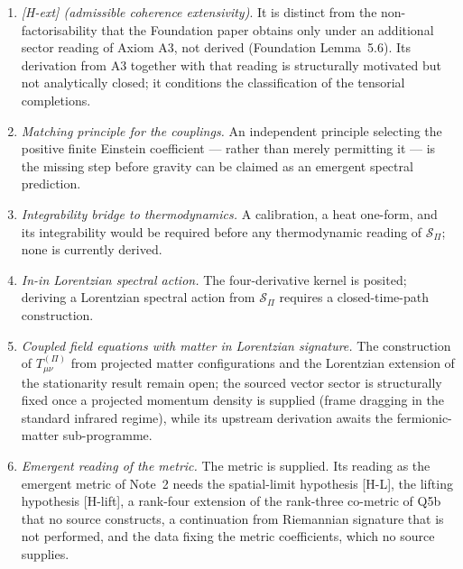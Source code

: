 \documentclass[11pt,a4paper]{article}
\theoremstyle{definition}
\newcommand{\SPI}{\mathcal{S}_\Pi}
\begin{document}
      \begin{enumerate}
        \item \textit{[H-ext] (admissible coherence extensivity)}.
        It is distinct from the non-factorisability that the Foundation paper obtains only under an
        additional sector reading of Axiom A3, not derived (Foundation Lemma~5.6).
        Its derivation from A3 together with that reading is structurally motivated but
        not analytically closed; it conditions the classification of the tensorial
        completions.

        \item \textit{Matching principle for the couplings.}
        An independent principle selecting the positive finite Einstein coefficient ---
        rather than merely permitting it --- is the missing step before gravity can be
        claimed as an emergent spectral prediction.

        \item \textit{Integrability bridge to thermodynamics.}
        A calibration, a heat one-form, and its integrability would be required before any
        thermodynamic reading of $\SPI$; none is currently derived.

        \item \textit{In-in Lorentzian spectral action.}
        The four-derivative kernel is posited; deriving a Lorentzian spectral action from
        $\SPI$ requires a closed-time-path construction.

        \item \textit{Coupled field equations with matter in Lorentzian signature.}
        The construction of $T_{\mu\nu}^{(\Pi)}$ from projected matter configurations and
        the Lorentzian extension of the stationarity result remain open; the sourced
        vector sector is structurally fixed once a projected momentum density is supplied
        (frame dragging in the standard infrared regime), while its upstream derivation
        awaits the fermionic-matter sub-programme.

        \item \textit{Emergent reading of the metric.}
        The metric is supplied.
        Its reading as the emergent metric of Note~2 needs the spatial-limit hypothesis [H-L], the lifting
        hypothesis [H-lift], a rank-four extension of the rank-three co-metric of Q5b that no source constructs,
        a continuation from Riemannian signature that is not performed, and the data fixing the metric coefficients,
        which no source supplies.
      \end{enumerate}
\end{document}
